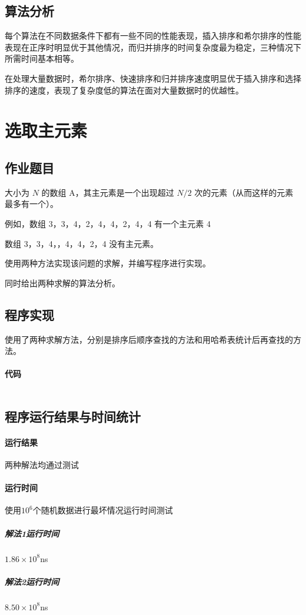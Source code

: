 \documentclass[UTF8]{ctexart}
\begin{document}
    \subsection{算法分析}
      每个算法在不同数据条件下都有一些不同的性能表现，插入排序和希尔排序的性能表现在正序时明显优于其他情况，而归并排序的时间复杂度最为稳定，三种情况下所需时间基本相等。

      在处理大量数据时，希尔排序、快速排序和归并排序速度明显优于插入排序和选择排序的速度，表现了复杂度低的算法在面对大量数据时的优越性。
  \section{选取主元素}
    \subsection{作业题目}
      大小为 $N$ 的数组 A，其主元素是一个出现超过 $N/2$ 次的元素（从而这样的元素最多有一个）。

      例如，数组 3，3，4，2，4，4，2，4，4 有一个主元素 4

      数组 3，3，4，，4，4，2，4 没有主元素。

      使用两种方法实现该问题的求解，并编写程序进行实现。

      同时给出两种求解的算法分析。

    \subsection{程序实现}
      使用了两种求解方法，分别是排序后顺序查找的方法和用哈希表统计后再查找的方法。
      \paragraph{代码}
      \inputminted{java}{src/Problem4.java}

    \subsection{程序运行结果与时间统计}
      \paragraph{运行结果} 两种解法均通过测试
      \paragraph{运行时间} 使用$10 ^ 6$个随机数据进行最坏情况运行时间测试
        \subparagraph{解法1运行时间} $1.86 \times 10 ^ 8$ns
        \subparagraph{解法2运行时间} $8.50 \times 10 ^ 8$ns
\end{document}
